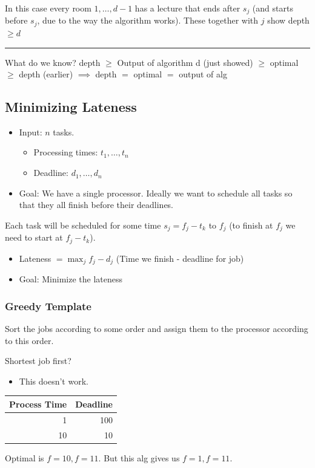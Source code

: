 \documentclass[11pt]{article}
\begin{document}
\begin{enumerate}
\begin{center}
\end{center}
In this case every room \(1,\ldots,d-1\) has a lecture that ends after \(s_j\) (and starts before \(s_j\), due to the way the algorithm works). These together with \(j\) show depth \(\geq d\)

\noindent\rule{\textwidth}{0.5pt}
What do we know? depth \(\geq\) Output of algorithm d (just showed) \(\geq\) optimal \(\geq\) depth (earlier) \(\implies\) depth \(=\) optimal \(=\) output of alg
\end{enumerate}
\subsection{Minimizing Lateness}
\label{sec:orgc759de0}
\begin{itemize}
\item Input: \(n\) tasks.
\begin{itemize}
\item Processing times: \(t_1, \ldots, t_n\)
\item Deadline: \(d_1,\ldots,d_n\)
\end{itemize}
\item Goal: We have a single processor. Ideally we want to schedule all tasks so that they all finish before their deadlines.
\end{itemize}
Each task will be scheduled for some time \(s_j = f_j-t_k\) to \(f_j\) (to finish at \(f_j\) we need to start at \(f_j-t_k\)).
\begin{itemize}
\item Lateness \(= \max_j{f_j - d_j}\) (Time we finish - deadline for job)
\item Goal: Minimize the lateness
\end{itemize}
\subsubsection{Greedy Template}
\label{sec:org68c7b1b}
Sort the jobs according to some order and assign them to the processor according to this order.

Shortest job first?
\begin{itemize}
\item This doesn't work.
\end{itemize}
\begin{center}
\begin{tabular}{rr}
Process Time & Deadline\\
\hline
1 & 100\\
10 & 10\\
\end{tabular}
\end{center}
Optimal is \(f=10, f=11\). But this alg gives us \(f=1, f=11\). 
\end{document}
